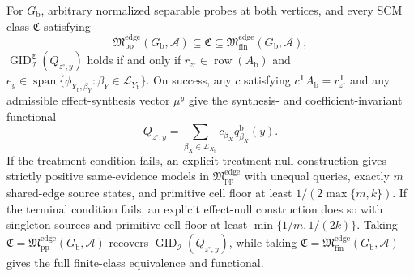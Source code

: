 For \(G_{\mathrm b}\), arbitrary normalized separable probes at both vertices, and every SCM class \(\mathfrak C\) satisfying
\[
\mathfrak M_{\mathrm{pp}}^{\mathrm{edge}}(G_{\mathrm b},\mathcal A)
\subseteq\mathfrak C
\subseteq\mathfrak M_{\mathrm{fin}}^{\mathrm{edge}}(G_{\mathrm b},\mathcal A),
\]
\(\operatorname{GID}_{\mathcal I}^{\mathfrak C}(Q_{z^{\circ},y})\) holds if and only if \(r_{z^{\circ}}\in\operatorname{row}(A_{\mathrm b})\) and \(e_y\in\operatorname{span}\{\phi_{Y_{\mathrm b},\beta_Y}:\beta_Y\in\mathcal L_{Y_{\mathrm b}}\}\).  On success, any \(c\) satisfying \(c^{\mathsf T}A_{\mathrm b}=r_{z^{\circ}}^{\mathsf T}\) and any admissible effect-synthesis vector \(\mu^y\) give the synthesis- and coefficient-invariant functional
\[
Q_{z^{\circ},y}=\sum_{\beta_X\in\mathcal L_{X_{\mathrm b}}}c_{\beta_X}q^{\mathrm b}_{\beta_X}(y).
\]
If the treatment condition fails, an explicit treatment-null construction gives strictly positive same-evidence models in \(\mathfrak M_{\mathrm{pp}}^{\mathrm{edge}}\) with unequal queries, exactly \(m\) shared-edge source states, and primitive cell floor at least \(1/(2\max\{m,k\})\).  If the terminal condition fails, an explicit effect-null construction does so with singleton sources and primitive cell floor at least \(\min\{1/m,1/(2k)\}\).  Taking \(\mathfrak C=\mathfrak M_{\mathrm{pp}}^{\mathrm{edge}}(G_{\mathrm b},\mathcal A)\) recovers \(\operatorname{GID}_{\mathcal I}(Q_{z^{\circ},y})\), while taking \(\mathfrak C=\mathfrak M_{\mathrm{fin}}^{\mathrm{edge}}(G_{\mathrm b},\mathcal A)\) gives the full finite-class equivalence and functional.